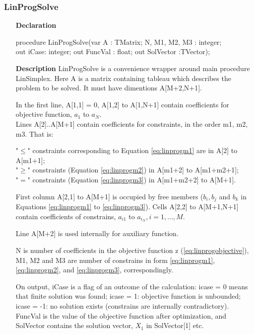 \documentclass[12pt,a4paper,oneside]{report}
\newcommand{\declarationitem}[1]{\textbf{#1}}
\newcommand{\descriptiontitle}[1]{\textbf{#1}}
\begin{document}
\subsubsection{LinProgSolve}
\label{linprog:LinProgSolve}
\begin{itemize}
	\item[\declarationitem{Declaration}\hfill]
	\begin{flushleft}
procedure LinProgSolve(var A : TMatrix; N, M1, M2, M3 : integer;\\
out iCase: integer; out FuncVal : float; out SolVector :TVector);
	\end{flushleft}
	\item[\descriptiontitle{Description}\hfill]
	LinProgSolve is a convenience wrapper around main procedure LinSimplex. Here A is a matrix containing tableau which describes the problem to be solved. It must have dimentions A[M+2,N+1]. 
	
	In the first line, A[1,1] = 0, A[1,2] to A[1,N+1] contain  coefficients for objective function, $a_1$ to $a_N$.\\
	Lines A[2]..A[M+1] contain coefficients for constraints, in the order m1, m2, m3. That is:
	
	"$\leq$" constraints corresponding to Equation \ref{eq:linprogm1} are in A[2] to A[m1+1];\\
	"$\geq$" constraints (Equation \ref{eq:linprogm2}) in A[m1+2] to A[m1+m2+1];\\
	"$=$" constraints (Equation \ref{eq:linprogm3})    in A[m1+m2+2] to A[M+1].
	
	First column A[2,1] to A[M+1] is occupied by free members ($b_i,b_j$ and $b_k$ in Equations \ref{eq:linprogm1} to \ref{eq:linprogm3}). Cells A[2,2] to A[M+1,N+1] contain coefficients of constrains, $a_{i1}$ to $a_{i_N}, i=1,\dots,M$.

	Line A[M+2] is used internally for auxiliary function. 
	
	N is number of coefficients in the objective function z (\ref{eq:linprogobjective}), M1, M2 and M3 are number of constrains in form \ref{eq:linprogm1}, \ref{eq:linprogm2}, and \ref{eq:linprogm3}, correspondingly. 
	
	On output, iCase is a flag of an outcome of the calculation: icase = 0 means that finite solution was found; icase = 1: objective function is unbounded;	icase = -1: no solution exists (constrains are internally contradictory). FuncVal is the value of the objective function after optimization, and SolVector contains the solution vector, $X_1$ in SolVector[1] etc.
\end{itemize}
\end{document}
